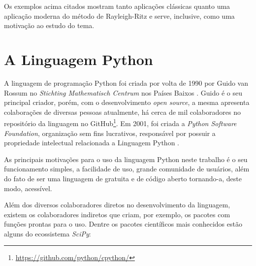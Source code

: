 \documentclass[
	12pt,				%
	openright,			%
    twoside,			%
	a4paper,			%
	english,			%
	french,				%
	spanish,			%
	brazil				%
	]{abntex2}
\numberwithin{lema}{chapter}
\numberwithin{teorema}{chapter}
\numberwithin{definicao}{chapter}
\numberwithin{exemplo}{chapter}
\numberwithin{figure}{chapter}
\begin{document}
Os exemplos acima citados mostram tanto aplicações clássicas quanto uma aplicação moderna do método de Rayleigh-Ritz e serve, inclusive, como uma motivação ao estudo do tema.

\section{A Linguagem Python}



A linguagem de programação Python foi criada por volta de 1990 por Guido van Rossum no \textit{Stichting Mathematisch Centrum} nos Países Baixos \cite{Python_history}. Guido é o seu principal criador, porém, com o desenvolvimento \textit{open source}, a mesma apresenta colaborações de diversas pessoas \textemdash\text{ }atualmente, há cerca de mil colaboradores no repositório da linguagem no GitHub\footnote{\url{https://github.com/python/cpython/}}. Em 2001, foi criada a \textit{Python Software Foundation}, organização sem fins lucrativos, responsável por possuir a propriedade intelectual relacionada a Linguagem Python \cite{Python_history}.

As principais motivações para o uso da linguagem Python neste trabalho é o seu funcionamento simples, a facilidade de uso, grande comunidade de usuários, além do fato de ser uma linguagem de gratuita e de código aberto tornando-a, deste modo, acessível.

Além dos diversos colaboradores diretos no desenvolvimento da linguagem, existem os colaboradores indiretos que criam, por exemplo, os pacotes com funções prontas para o uso. Dentre os pacotes científicos mais conhecidos estão alguns do ecossistema \textit{SciPy}:
\end{document}
